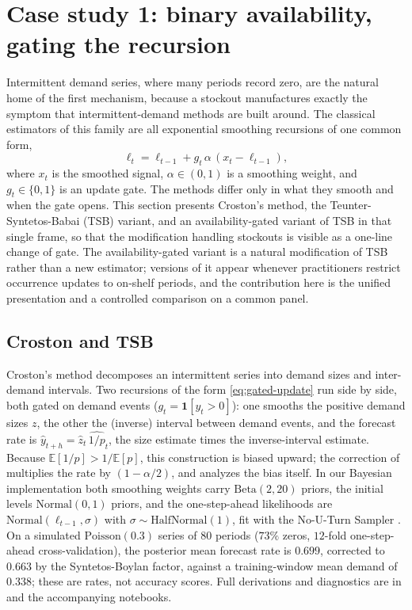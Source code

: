 \section{Case study 1: binary availability, gating the recursion}\label{sec:cs1}

Intermittent demand series, where many periods record zero, are the natural home of the first mechanism, because a stockout manufactures exactly the symptom that intermittent-demand methods are built around. The classical estimators of this family are all exponential smoothing recursions of one common form,
\begin{equation}\label{eq:gated-update}
\ell_t = \ell_{t-1} + g_t \, \alpha \, (x_t - \ell_{t-1}),
\end{equation}
where $x_t$ is the smoothed signal, $\alpha \in (0,1)$ is a smoothing weight, and $g_t \in \{0,1\}$ is an update gate. The methods differ only in what they smooth and when the gate opens. This section presents Croston's method, the Teunter-Syntetos-Babai (TSB) variant, and an availability-gated variant of TSB in that single frame, so that the modification handling stockouts is visible as a one-line change of gate. The availability-gated variant is a natural modification of TSB rather than a new estimator; versions of it appear whenever practitioners restrict occurrence updates to on-shelf periods, and the contribution here is the unified presentation and a controlled comparison on a common panel.

\subsection{Croston and TSB}\label{sec:croston-tsb}

Croston's method \citep{croston1972forecasting} decomposes an intermittent series into demand sizes and inter-demand intervals. Two recursions of the form \eqref{eq:gated-update} run side by side, both gated on demand events ($g_t = \mathbf{1}[y_t > 0]$): one smooths the positive demand sizes $z$, the other the (inverse) interval between demand events, and the forecast rate is $\hat{y}_{t+h} = \hat{z}_t \, \widehat{1/p}_t$, the size estimate times the inverse-interval estimate. Because $\mathbb{E}[1/p] > 1/\mathbb{E}[p]$, this construction is biased upward; the correction of \citet{syntetos2005accuracy} multiplies the rate by $(1 - \alpha/2)$, and \citet{syntetos2001bias} analyzes the bias itself. In our Bayesian implementation both smoothing weights carry $\text{Beta}(2, 20)$ priors, the initial levels $\text{Normal}(0, 1)$ priors, and the one-step-ahead likelihoods are $\text{Normal}(\ell_{t-1}, \sigma)$ with $\sigma \sim \text{HalfNormal}(1)$, fit with the No-U-Turn Sampler \citep{hoffman2014nuts}. On a simulated $\text{Poisson}(0.3)$ series of $80$ periods ($73\%$ zeros, $12$-fold one-step-ahead cross-validation), the posterior mean forecast rate is $0.699$, corrected to $0.663$ by the Syntetos-Boylan factor, against a training-window mean demand of $0.338$; these are rates, not accuracy scores. Full derivations and diagnostics are in \citet{boylan2021intermittent} and the accompanying notebooks.

